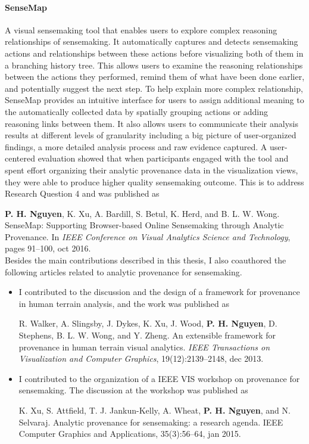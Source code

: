 \paragraph{SenseMap} A visual sensemaking tool that enables users to explore complex reasoning relationships of sensemaking. It automatically captures and detects sensemaking actions and relationships between these actions before visualizing both of them in a branching history tree. This allows users to examine the reasoning relationships between the actions they performed, remind them of what have been done earlier, and potentially suggest the next step. To help explain more complex relationship, SenseMap provides an intuitive interface for users to assign additional meaning to the automatically collected data by spatially grouping actions or adding reasoning links between them. It also allows users to communicate their analysis results at different levels of granularity including a big picture of user-organized findings, a more detailed analysis process and raw evidence captured. A user-centered evaluation showed that when participants engaged with the tool and spent effort organizing their analytic provenance data in the visualization views, they were able to produce higher quality sensemaking outcome. This is to address Research Question 4 and was published as

\textbf{P. H. Nguyen}, K. Xu, A. Bardill, S. Betul, K. Herd, and B. L. W. Wong. SenseMap: Supporting Browser-based Online Sensemaking through Analytic Provenance. In \textit{IEEE Conference on Visual Analytics Science and Technology}, pages 91--100, oct 2016.
\\

\noindent Besides the main contributions described in this thesis, I also coauthored the following articles related to analytic provenance for sensemaking.

\begin{itemize}
	\item I contributed to the discussion and the design of a framework for provenance in human terrain analysis, and the work was published as

	\quad R. Walker, A. Slingsby, J. Dykes, K. Xu, J. Wood, \textbf{P. H. Nguyen}, D. Stephens, B. L. W. Wong, and Y. Zheng. An extensible framework for provenance in human terrain visual analytics. \textit{IEEE Transactions on Visualization and Computer Graphics}, 19(12):2139--2148, dec 2013.

	\item I contributed to the organization of a IEEE VIS workshop on provenance for sensemaking. The discussion at the workshop was published as

	\quad K. Xu, S. Attfield, T. J. Jankun-Kelly, A. Wheat, \textbf{P. H. Nguyen}, and N. Selvaraj. Analytic provenance for sensemaking: a research agenda. IEEE Computer Graphics and Applications, 35(3):56--64, jan 2015.
\end{itemize}

